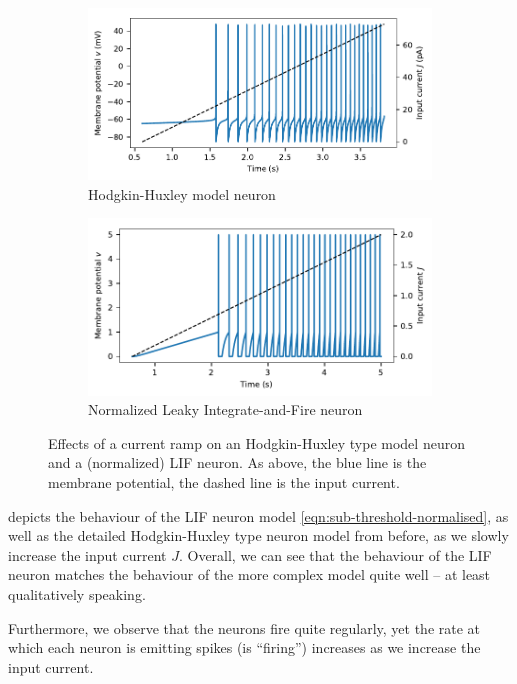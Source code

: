 \documentclass[10pt,letterpaper,oneside]{article}
\begin{document}
\begin{figure}[t]
	\begin{subfigure}{\textwidth}
		\centering
		\includegraphics{media/hh_neuron_ramp.pdf}
		\caption{Hodgkin-Huxley model neuron}
	\end{subfigure}
	\begin{subfigure}{\textwidth}
		\centering
		\includegraphics{media/lif_neuron_ramp.pdf}
		\caption{Normalized Leaky Integrate-and-Fire neuron}
	\end{subfigure}
	\caption{Effects of a current ramp on an Hodgkin-Huxley type model neuron and a (normalized) LIF neuron. As above, the blue line is the membrane potential, the dashed line is the input current.}
	\label{fig:current_ramp}
\end{figure}

 depicts the behaviour of the LIF neuron model \cref{eqn:sub-threshold-normalised}, as well as the detailed Hodgkin-Huxley type neuron model from before, as we slowly increase the input current $J$. Overall, we can see that the behaviour of the LIF neuron matches the behaviour of the more complex model quite well -- at least qualitatively speaking.

Furthermore, we observe that the neurons fire quite regularly, yet the rate at which each neuron is emitting spikes (is \enquote{firing}) increases as we increase the input current.
\end{document}
